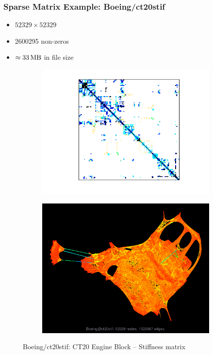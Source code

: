 \documentclass[t,12pt,numbers,fleqn]{beamer}
\begin{document}
\begin{frame}
\frametitle{Sparse Matrix Example: Boeing/ct20stif}

\begin{itemize}
\item \(\num{52329} \times \num{52329}\)
\item \num{2600295} non-zeros
\item \(\approx \SI{33}{\mega\byte}\) in file size
\end{itemize}

\begin{figure}[hh]
  \centering
  \begin{subfigure}[b]{0.5\textwidth}
    \centering
    \includegraphics[width=\textwidth,trim={2cm 1.5cm 2cm 1cm},clip]{figures/ct20stif}
  \end{subfigure}
  \begin{subfigure}[b]{0.4\textwidth}
    \centering
    \includegraphics[width=\textwidth]{figures/ct20stif_graph}
  \end{subfigure}
  \caption*{Boeing/ct20stif: CT20 Engine Block -- Stiffness
    matrix}
  \label{fig:ct20}
\end{figure}

\end{frame}
\end{document}
